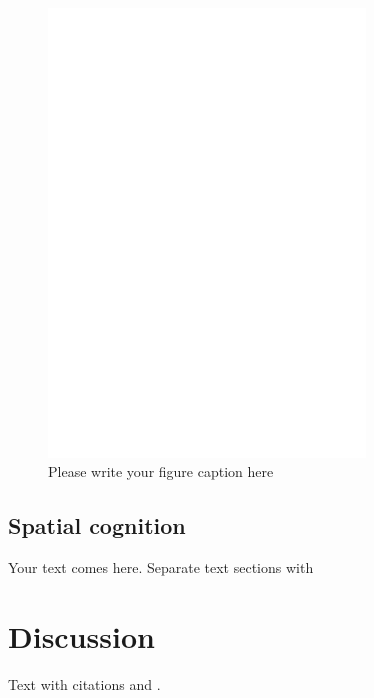 \begin{figure}
  \includegraphics[width=0.75\textwidth]{bfeed_mob}
\caption{Please write your figure caption here}
\label{fig:1}       %
\end{figure}

	\subsection{Spatial cognition}
	\label{sec:3.2}
Your text comes here. Separate text sections with

\section{Discussion}
\label{sec:4}
Text with citations \cite{RefB} and \cite{RefJ}.

